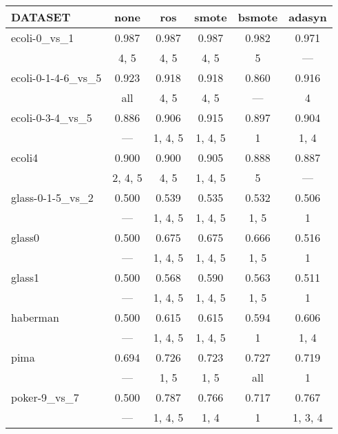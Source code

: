 \begin{tabular}{lccccc}
\hline
 DATASET                    & none    & ros     & smote   & bsmote   & adasyn   \\
\hline
 ecoli-0\_vs\_1               & 0.987   & 0.987   & 0.987   & 0.982    & 0.971    \\
                            & 4, 5    & 4, 5    & 4, 5    & 5        & ---      \\
 ecoli-0-1-4-6\_vs\_5         & 0.923   & 0.918   & 0.918   & 0.860    & 0.916    \\
                            & all     & 4, 5    & 4, 5    & ---      & 4        \\
 ecoli-0-3-4\_vs\_5           & 0.886   & 0.906   & 0.915   & 0.897    & 0.904    \\
                            & ---     & 1, 4, 5 & 1, 4, 5 & 1        & 1, 4     \\
 ecoli4                     & 0.900   & 0.900   & 0.905   & 0.888    & 0.887    \\
                            & 2, 4, 5 & 4, 5    & 1, 4, 5 & 5        & ---      \\
 glass-0-1-5\_vs\_2           & 0.500   & 0.539   & 0.535   & 0.532    & 0.506    \\
                            & ---     & 1, 4, 5 & 1, 4, 5 & 1, 5     & 1        \\
 glass0                     & 0.500   & 0.675   & 0.675   & 0.666    & 0.516    \\
                            & ---     & 1, 4, 5 & 1, 4, 5 & 1, 5     & 1        \\
 glass1                     & 0.500   & 0.568   & 0.590   & 0.563    & 0.511    \\
                            & ---     & 1, 4, 5 & 1, 4, 5 & 1, 5     & 1        \\
 haberman                   & 0.500   & 0.615   & 0.615   & 0.594    & 0.606    \\
                            & ---     & 1, 4, 5 & 1, 4, 5 & 1        & 1, 4     \\
 pima                       & 0.694   & 0.726   & 0.723   & 0.727    & 0.719    \\
                            & ---     & 1, 5    & 1, 5    & all      & 1        \\
 poker-9\_vs\_7               & 0.500   & 0.787   & 0.766   & 0.717    & 0.767    \\
                            & ---     & 1, 4, 5 & 1, 4    & 1        & 1, 3, 4  \\

\end{tabular}
